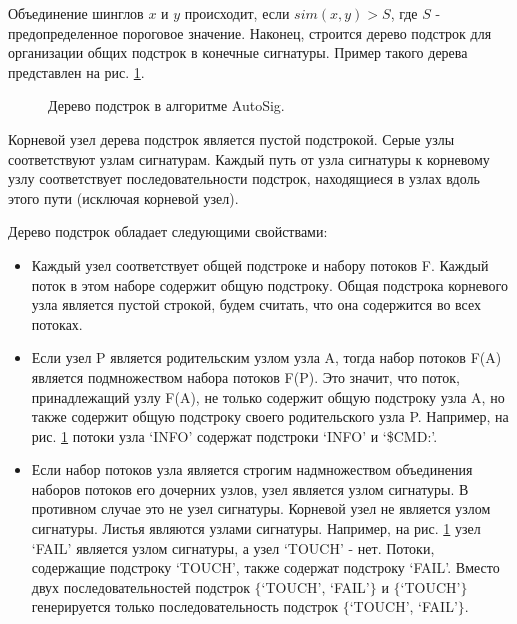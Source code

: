 Объединение шинглов $x$ и $y$ происходит, если $sim(x, y)>S$, где $S$ - предопределенное пороговое значение.
Наконец, строится дерево подстрок для организации общих подстрок в конечные сигнатуры. Пример такого дерева представлен на рис. \ref{autosig:tree}.

\begin{figure}[H]
    \begin{center}
        
        \caption{Дерево подстрок в алгоритме AutoSig.}\label{autosig:tree}
    \end{center}
\end{figure}

Корневой узел дерева подстрок является пустой подстрокой. Серые узлы соответствуют узлам сигнатурам.
Каждый путь от узла сигнатуры к корневому узлу соответствует последовательности подстрок,
находящиеся в узлах вдоль этого пути (исключая корневой узел).

Дерево подстрок обладает следующими свойствами:

\begin{itemize}
    \item Каждый узел соответствует общей подстроке и набору потоков F.
    Каждый поток в этом наборе содержит общую подстроку.
    Общая подстрока корневого узла является пустой строкой, будем считать, что она содержится во всех потоках.

    \item Если узел P является родительским узлом узла A, тогда набор потоков F(A) является подмножеством набора потоков F(P).
    Это значит, что поток, принадлежащий узлу F(A), не только содержит общую подстроку узла A, но также содержит общую подстроку своего родительского узла P.
    Например, на рис. \ref{autosig:tree} потоки узла `INFO' содержат подстроки `INFO' и `\$CMD:'.

    \item Если набор потоков узла является строгим надмножеством объединения наборов потоков его дочерних узлов, узел является узлом сигнатуры.
    В противном случае это не узел сигнатуры. Корневой узел не является узлом сигнатуры. Листья являются узлами сигнатуры.
    Например, на рис. \ref{autosig:tree} узел `FAIL' является узлом сигнатуры, а узел `TOUCH' - нет.
    Потоки, содержащие подстроку `TOUCH', также содержат подстроку `FAIL'.
    Вместо двух последовательностей подстрок $\{$`TOUCH', `FAIL'$\}$ и $\{$`TOUCH'$\}$
    генерируется только последовательность подстрок $\{$`TOUCH', `FAIL'$\}$.

\end{itemize}

